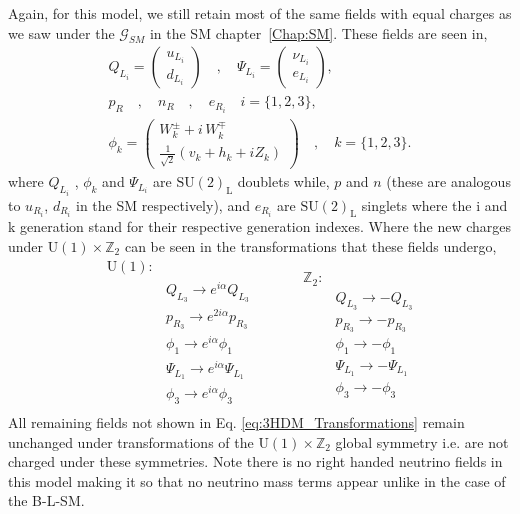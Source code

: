 \documentclass[10pt]{book}
\renewcommand{\(}{\left(}
\renewcommand{\)}{\right)}
\renewcommand{\[}{\left[}
\renewcommand{\]}{\right]}
\begin{document}
Again, for this model, we still retain most of the same fields with equal charges as we saw under the $\mathcal{G}_{SM}$ in the SM chapter~\ref{Chap:SM}. These fields are seen in, 
%
\begin{equation}
\label{eq:3HDM_Fields}
\begin{gathered}
Q_{L_i} =  \begin{pmatrix}
u_{L_i}  \\
d_{L_i}
\end{pmatrix} \quad , \quad \Psi_{L_i} =  \begin{pmatrix}
\nu_{L_i}  \\
e_{L_i}
\end{pmatrix}  ,  \\ 
p_R \quad , \quad n_R \quad , \quad e_{R_i} \quad i=\{1,2,3\}  ,  \\  
\phi_k = \begin{pmatrix}
W_k^\pm + i \, W_k^\mp \\ 
\frac{1}{\sqrt{2}}\left( v_k + h_k + i Z_k \right) 
\end{pmatrix}  \quad , \quad k=\{ 1,2,3\}  . 
\end{gathered} 
\end{equation}
%
where $Q_{L_i}$ , $\phi_k$ and $\Psi_{L_i}$ are $\mathrm{SU(2)_L}$ doublets while, $p$ and $n$ (these are analogous to $u_{R_i}$, $d_{R_i}$ in the SM respectively), and $e_{R_i}$ are $\mathrm{SU(2)_L}$ singlets where the i and k generation stand for their respective generation indexes. 
%
Where the new charges under $\mathrm{U(1)}\times\mathbb{Z}_2$ can be seen in the transformations that these fields undergo, 
%
\begin{equation}
\label{eq:3HDM_Transformations}
	\begin{split} 
	\mathrm{U(1)} : & \\
		& Q_{L_3} \rightarrow    e^{i \alpha} Q_{L_3}  \\  
		& p_{R_3} \rightarrow    e^{2 i \alpha} p_{R_3}  \\
		& \phi_1  \rightarrow    e^{i \alpha} \phi_1  \\   
		& \Psi_{L_1} \rightarrow e^{i \alpha} \Psi_{L_1} \\
		& \phi_3 \rightarrow     e^{i \alpha} \phi_3  \\ 
	\end{split} \quad \quad \quad  
	\begin{split}
		\mathbb{Z}_2 : & \\
		 	& Q_{L_3} \rightarrow -Q_{L_3} \\
		 	& p_{R_3} \rightarrow -p_{R_3} \\ 
		 	& \phi_1  \rightarrow -\phi_1 \\ 
		 	& \Psi_{L_1} \rightarrow - \Psi_{L_1} \\ 
		 	& \phi_3 \rightarrow -\phi_3
	\end{split}  
\end{equation} 
%
All remaining fields not shown in Eq. \ref{eq:3HDM_Transformations} remain unchanged under transformations of the $\mathrm{U(1)}\times\mathbb{Z}_2$ global symmetry i.e. are not charged under these symmetries.  
%
Note there is no right handed neutrino fields in this model making it so that no neutrino mass terms appear unlike in the case of the B-L-SM.
\end{document}
